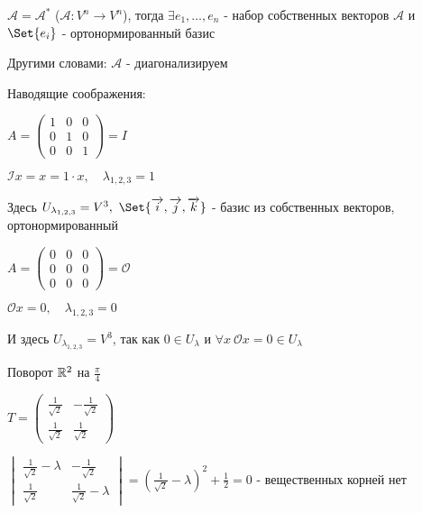 \documentclass[12pt]{article}
\begin{document}
    \hypertarget{theoremabouteigenvectorsinselfconjugateoperator}{}

    \begin{MyTheorem}
        \Ths $\mathcal{A} = \mathcal{A}^*$ ($\mathcal{A} : V^n \to V^n$),
        тогда $\exists e_1, \dots, e_n$ - набор собственных векторов $\mathcal{A}$ и $\Set{e_i}$ - ортонормированный базис

        Другими словами: $\mathcal{A}$ - диагонализируем
    \end{MyTheorem}

    Наводящие соображения:

     $A = \begin{pmatrix}1 & 0 & 0 \\ 0 & 1 & 0 \\ 0 & 0 & 1\end{pmatrix} = I$

    $\mathcal{I}x = x = 1 \cdot x, \quad \lambda_{1,2,3} = 1$

    Здесь $U_{\lambda_{1,2,3}} = V^3, \ \Set{\overrightarrow{i}, \overrightarrow{j}, \overrightarrow{k}}$ - базис из собственных векторов, ортонормированный

     $A = \begin{pmatrix}0 & 0 & 0 \\ 0 & 0 & 0 \\ 0 & 0 & 0\end{pmatrix} = \mathcal{O}$

    $\mathcal{O}x = 0, \quad \lambda_{1,2,3} = 0$

    И здесь $U_{\lambda_{1,2,3}} = V^3$, так как $0 \in U_\lambda$ и $\forall x \ \mathcal{O}x = 0 \in U_\lambda$

     Поворот $\mathbb{R}^2$ на $\frac{\pi}{4}$

    $T = \begin{pmatrix}\frac{1}{\sqrt{2}} & -\frac{1}{\sqrt{2}} \\ \frac{1}{\sqrt{2}} & \frac{1}{\sqrt{2}}\end{pmatrix}$

    $\begin{vmatrix}\frac{1}{\sqrt{2}} - \lambda & -\frac{1}{\sqrt{2}} \\ \frac{1}{\sqrt{2}} & \frac{1}{\sqrt{2}} - \lambda\end{vmatrix} =
    \left(\frac{1}{\sqrt{2}} - \lambda\right)^2 + \frac{1}{2} = 0$ - вещественных корней нет
\end{document}
